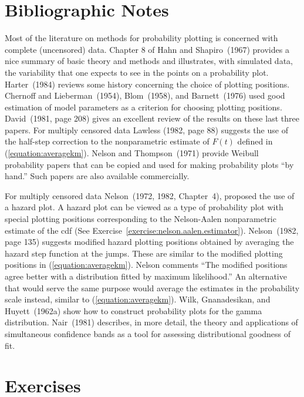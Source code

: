 \section*{Bibliographic Notes}
Most of the literature on methods for probability plotting
is concerned with complete (uncensored) data. Chapter 8 of Hahn 
and Shapiro~(1967) provides
a nice summary of basic theory and methods and illustrates, with
simulated data, the variability
that one expects to see in the points on a probability
plot.  Harter~(1984) reviews some history concerning the choice of
plotting positions. Chernoff and Lieberman~(1954), Blom~(1958), and
Barnett~(1976) used good estimation of model parameters as a criterion
for choosing plotting positions. David~(1981, page 208) gives 
an excellent review of the results on these last three
papers. For multiply censored data Lawless
(1982, page 88) suggests the use of the half-step correction to the
nonparametric estimate of $F(t)$ defined in
(\ref{equation:averagekm}).
Nelson and Thompson~(1971) provide Weibull probability papers
that can be copied and used for making
probability plots ``by hand.'' Such papers are also available
commercially.


For multiply censored data Nelson~(1972, 1982, Chapter~4), proposed
the use of a hazard plot. A hazard plot can be viewed as a type of
probability plot with special plotting positions corresponding to
the Nelson-Aalen nonparametric estimate of the cdf (See
Exercise~\ref{exercise:nelson.aalen.estimator}).  Nelson~(1982, page
135) suggests modified hazard plotting positions obtained by averaging
the hazard step function at the jumps.  These are similar to the
modified plotting positions in (\ref{equation:averagekm}).  Nelson
comments ``The modified positions agree better with a distribution
fitted by maximum likelihood.'' An alternative that would serve the
same purpose would average the estimates in the probability scale
instead, similar to (\ref{equation:averagekm}).  Wilk, Gnanadesikan,
and Huyett~(1962a) show how to construct probability plots for the
gamma distribution.  Nair~(1981) describes, in more detail, the theory
and applications of simultaneous confidence bands as a tool for
assessing distributional goodness of fit.


\section*{Exercises}

